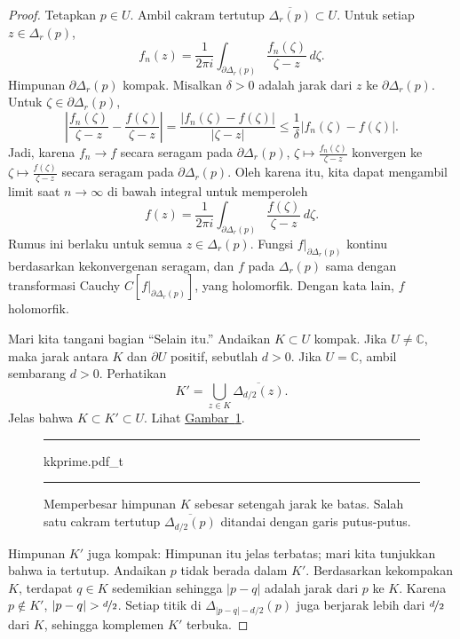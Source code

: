 \documentclass[12pt,openany]{book}
\newcommand{\sabs}[1]{\lvert {#1} \rvert}
\newcommand{\abs}[1]{\left\lvert {#1} \right\rvert}
\newcommand{\C}{{\mathbb{C}}}
\newcommand{\myquote}[1]{``#1''}
\theoremstyle{plain}
\theoremstyle{remark}
\theoremstyle{definition}
\newenvironment{myfig}{%
\begin{figure}[h!t]
\noindent\rule{\textwidth}{0.5pt}\vspace{12pt}\par\centering}%
{\par\noindent\rule{\textwidth}{0.5pt}
\end{figure}}
\theoremstyle{exercise}
\theoremstyle{example}
\newcommand{\figureref}[1]{\hyperref[#1]{Gambar~\ref*{#1}}}
\begin{document}
\begin{proof}
Tetapkan $p \in U$.
Ambil cakram tertutup $\overline{\Delta_r(p)} \subset U$.
Untuk setiap $z \in \Delta_r(p)$,
\begin{equation*}
f_n(z) = \frac{1}{2\pi i}
\int_{\partial \Delta_r(p)} \frac{f_n(\zeta)}{\zeta-z} \, d\zeta .
\end{equation*}
Himpunan $\partial \Delta_r(p)$ kompak.
Misalkan $\delta > 0$ adalah jarak dari $z$ ke
$\partial \Delta_r(p)$.
Untuk $\zeta \in \partial \Delta_r(p)$,
\begin{equation*}
\abs{\frac{f_n(\zeta)}{\zeta-z}
-
\frac{f(\zeta)}{\zeta-z}
}
=
\frac{\sabs{f_n(\zeta)-f(\zeta)}}{\sabs{\zeta-z}}
\leq
\frac{1}{\delta}
\sabs{f_n(\zeta)-f(\zeta)} .
\end{equation*}
Jadi, karena $f_n \to f$ secara seragam pada $\partial \Delta_r(p)$,
$\zeta \mapsto \frac{f_n(\zeta)}{\zeta-z}$ konvergen ke 
$\zeta \mapsto \frac{f(\zeta)}{\zeta-z}$ secara seragam pada $\partial \Delta_r(p)$.
Oleh karena itu, kita dapat mengambil limit saat $n \to \infty$ di bawah integral
untuk memperoleh
\begin{equation*}
f(z) = \frac{1}{2\pi i}
\int_{\partial \Delta_r(p)} \frac{f(\zeta)}{\zeta-z} \, d\zeta .
\end{equation*}
Rumus ini berlaku untuk semua $z \in \Delta_r(p)$.
Fungsi $f|_{\partial \Delta_r(p)}$ kontinu berdasarkan kekonvergenan
seragam, dan $f$ pada $\Delta_r(p)$ sama dengan
transformasi Cauchy
$C[f|_{\partial \Delta_r(p)}]$, yang holomorfik.  Dengan kata lain,
$f$ holomorfik.

Mari kita tangani bagian \myquote{Selain itu.}
Andaikan $K \subset U$ kompak.  Jika $U \neq \C$, maka jarak antara
$K$ dan $\partial U$ positif, sebutlah $d > 0$.
Jika $U=\C$, ambil sembarang $d > 0$.  Perhatikan 
\begin{equation*}
K' = \bigcup_{z \in K} \overline{\Delta_{d/2}(z)} .
\end{equation*}
Jelas bahwa $K \subset K' \subset U$.
Lihat \figureref{fig:kkprime}.

\begin{myfig}
{kkprime.pdf_t}
\caption{Memperbesar himpunan $K$ sebesar setengah jarak ke batas.  Salah satu
cakram tertutup $\overline{\Delta_{d/2}(p)}$ ditandai dengan garis putus-putus.\label{fig:kkprime}}
\end{myfig}

Himpunan $K'$ juga kompak: Himpunan itu jelas
terbatas; mari kita tunjukkan bahwa ia tertutup.  Andaikan $p$ tidak berada dalam $K'$.
Berdasarkan kekompakan $K$, terdapat $q \in K$ sedemikian sehingga $\sabs{p-q}$
adalah jarak dari $p$ ke $K$.  Karena $p \notin K'$,
$\sabs{p-q} > \nicefrac{d}{2}$.
Setiap titik di $\Delta_{\sabs{p-q}-d/2}(p)$
juga berjarak lebih dari $\nicefrac{d}{2}$ dari $K$, sehingga
komplemen $K'$ terbuka.


\end{proof}
\end{document}
